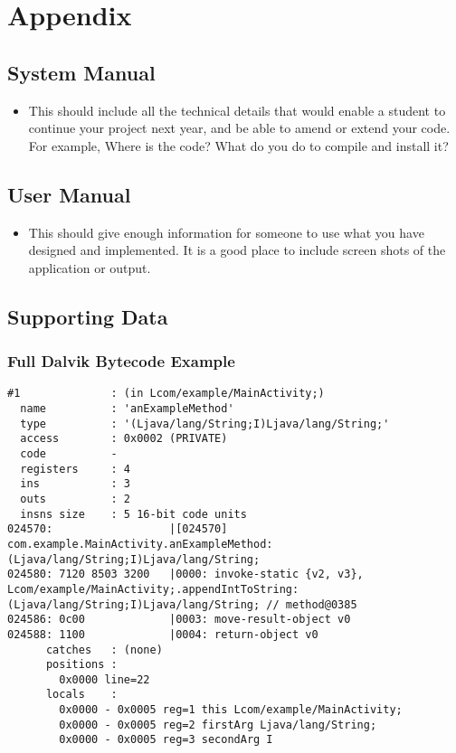 \section{Appendix}
\label{sec:appendix}

\subsection{System Manual}

\begin{mdframed}
	\begin{itemize}
		\item This should include all the technical details that would enable a
		student to continue your project next year, and be able to amend or extend
		your code. For example, Where is the code? What do you do to compile and
		install it?
	\end{itemize}
\end{mdframed}

\subsection{User Manual}

\begin{mdframed}
	\begin{itemize}
		\item This should give enough information for someone to use what you have
		designed and implemented. It is a good place to include screen shots of the
		application or output.
	\end{itemize}
\end{mdframed}

\subsection{Supporting Data}

\subsubsection{Full Dalvik Bytecode Example}
\label{sec:sec:full_dalvik_bytecode_example}

\begin{lstlisting}
#1              : (in Lcom/example/MainActivity;)
  name          : 'anExampleMethod'
  type          : '(Ljava/lang/String;I)Ljava/lang/String;'
  access        : 0x0002 (PRIVATE)
  code          -
  registers     : 4
  ins           : 3
  outs          : 2
  insns size    : 5 16-bit code units
024570:                  |[024570] com.example.MainActivity.anExampleMethod:(Ljava/lang/String;I)Ljava/lang/String;
024580: 7120 8503 3200   |0000: invoke-static {v2, v3}, Lcom/example/MainActivity;.appendIntToString:(Ljava/lang/String;I)Ljava/lang/String; // method@0385
024586: 0c00             |0003: move-result-object v0
024588: 1100             |0004: return-object v0
      catches   : (none)
      positions :
        0x0000 line=22
      locals    :
        0x0000 - 0x0005 reg=1 this Lcom/example/MainActivity;
        0x0000 - 0x0005 reg=2 firstArg Ljava/lang/String;
        0x0000 - 0x0005 reg=3 secondArg I
\end{lstlisting}

